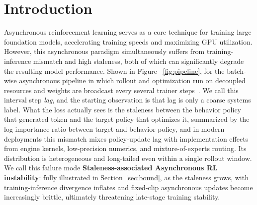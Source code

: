 \section{Introduction}
\label{sec:intro}
 
Asynchronous reinforcement learning serves as a core technique for training large foundation models, accelerating training speeds and maximizing GPU utilization. However, this asynchronous paradigm simultaneously suffers from training-inference mismatch and high staleness, both of which can significantly degrade the resulting model performance.
Shown in Figure ~\ref{fig:pipeline}, for the batch-wise asynchronous pipeline in which rollout and optimization run on decoupled resources and weights are broadcast every several trainer steps~\citep{zhu2025slime,zheng2023sglang,shoeybi2019megatron}. 
We call this interval step \emph{lag}, and the starting observation is that lag is only a coarse systems label. 
What the loss actually sees is the staleness between the behavior policy that generated token and the target policy that optimizes it, summarized by the log importance ratio between target and behavior policy, and in modern deployments this mismatch mixes policy-update lag with implementation effects from engine kernels, low-precision numerics, and mixture-of-experts routing. Its distribution is heterogeneous and long-tailed even within a single rollout window. 
We call this failure mode \textbf{Staleness-associated Asynchronous RL instability}: fully illustrated in Section~\ref{sec:bound}, as the staleness grows, with training-inference divergence inflates and fixed-clip asynchronous updates become increasingly brittle, ultimately threatening late-stage training stability.
 
